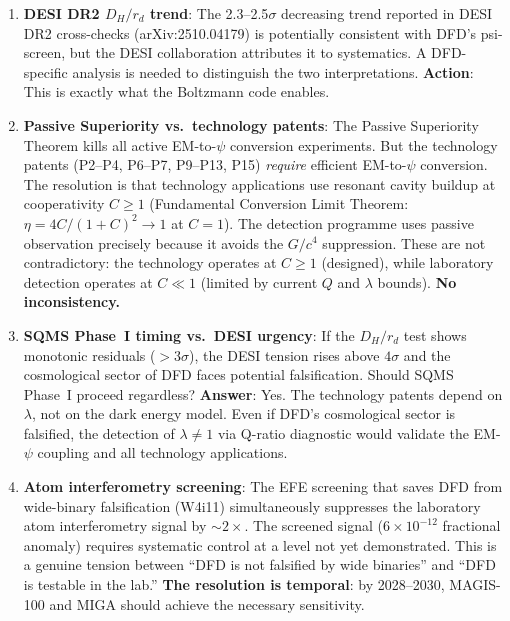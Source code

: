 \documentclass[11pt]{article}
\newcommand{\ee}[1]{\times 10^{#1}}
\begin{document}
\begin{enumerate}
\item \textbf{DESI DR2 $D_H/r_d$ trend}: The 2.3--2.5$\sigma$ decreasing
  trend reported in DESI DR2 cross-checks (arXiv:2510.04179) is
  potentially consistent with DFD's psi-screen, but the DESI collaboration
  attributes it to systematics. A DFD-specific analysis is needed to
  distinguish the two interpretations. \textbf{Action}: This is exactly
  what the Boltzmann code enables.

\item \textbf{Passive Superiority vs.\ technology patents}: The Passive
  Superiority Theorem kills all active EM-to-$\psi$ conversion experiments.
  But the technology patents (P2--P4, P6--P7, P9--P13, P15) \emph{require}
  efficient EM-to-$\psi$ conversion. The resolution is that technology
  applications use resonant cavity buildup at cooperativity $C \geq 1$
  (Fundamental Conversion Limit Theorem: $\eta = 4C/(1+C)^2 \to 1$
  at $C = 1$). The detection programme uses passive observation precisely
  because it avoids the $G/c^4$ suppression. These are not contradictory:
  the technology operates at $C \geq 1$ (designed), while laboratory
  detection operates at $C \ll 1$ (limited by current $Q$ and $\lambda$
  bounds). \textbf{No inconsistency.}

\item \textbf{SQMS Phase~I timing vs.\ DESI urgency}: If the $D_H/r_d$
  test shows monotonic residuals ($>3\sigma$), the DESI tension rises
  above $4\sigma$ and the cosmological sector of DFD faces potential
  falsification. Should SQMS Phase~I proceed regardless?
  \textbf{Answer}: Yes. The technology patents depend on $\lambda$,
  not on the dark energy model. Even if DFD's cosmological sector
  is falsified, the detection of $\lambda \neq 1$ via Q-ratio
  diagnostic would validate the EM-$\psi$ coupling and all
  technology applications.

\item \textbf{Atom interferometry screening}: The EFE screening that
  saves DFD from wide-binary falsification (W4i11) simultaneously
  suppresses the laboratory atom interferometry signal by $\sim 2\times$.
  The screened signal ($6\ee{-12}$ fractional anomaly) requires
  systematic control at a level not yet demonstrated. This is
  a genuine tension between ``DFD is not falsified by wide binaries''
  and ``DFD is testable in the lab.'' \textbf{The resolution is
  temporal}: by 2028--2030, MAGIS-100 and MIGA should achieve the
  necessary sensitivity.
\end{enumerate}
\end{document}

